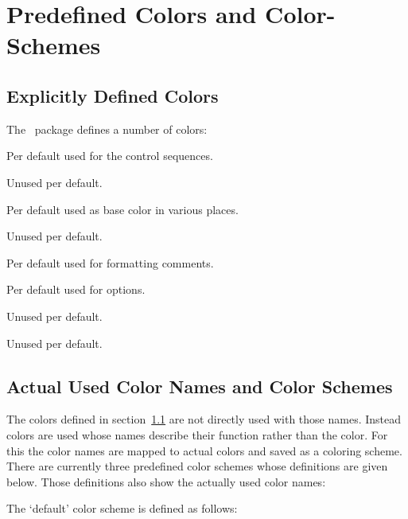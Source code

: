 \documentclass[load-preamble]{cnltx-doc}
\makeatletter
\def\cnltxbase{\cnltx@package@name@format{cnltx-base}}
\newenvironment{colors}
  {%
    \def\colour##1{\item\code{\textcolor{##1}{##1}}}%
    \cnltxlist
  }
  {\endcnltxlist}
\makeatother
\begin{document}
\section{Predefined Colors and Color-Schemes}\label{sec:colors}
\subsection{Explicitly Defined Colors}\label{sec:colors:definitions}

The \cnltxbase\ package defines a number of colors:
\begin{colors}
  \colour{cnltxbrown}
    Per default used for the control sequences.
  \colour{cnltxblue}
    Unused per default.
  \colour{cnltxred}
    Per default used as base color in various places.
  \colour{cnltxgreen}
    Unused per default.
  \colour{cnltxgray}
    Per default used for formatting comments.
  \colour{cnltxyellow}
    Per default used for options.
  \colour{cnltxformalblue}
    Unused per default.
  \colour{cnltxformalred}
    Unused per default.
\end{colors}

\subsection{Actual Used Color Names and Color Schemes}

The colors defined in section~\ref{sec:colors:definitions} are not directly
used with those names.  Instead colors are used whose names describe their
function rather than the color.  For this the color names are mapped to actual
colors and saved as a coloring scheme.  There are currently three predefined
color schemes whose definitions are given below.  Those definitions also show
the actually used color names:

The `default' color scheme is defined as follows:
\begin{sourcecode}
\end{sourcecode}
\end{document}
